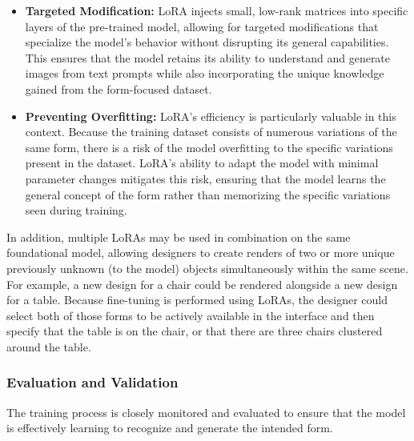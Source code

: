 \documentclass{article}
\begin{document}
\begin{itemize}
    \item \textbf{Targeted Modification:} LoRA injects small, low-rank matrices into specific layers of the pre-trained model, allowing for targeted modifications that specialize the model's behavior without disrupting its general capabilities. This ensures that the model retains its ability to understand and generate images from text prompts while also incorporating the unique knowledge gained from the form-focused dataset.
    \item \textbf{Preventing Overfitting:} LoRA's efficiency is particularly valuable in this context. Because the training dataset consists of numerous variations of the same form, there is a risk of the model overfitting to the specific variations present in the dataset. LoRA's ability to adapt the model with minimal parameter changes mitigates this risk, ensuring that the model learns the general concept of the form rather than memorizing the specific variations seen during training.
\end{itemize}

In addition, multiple LoRAs may be used in combination on the same foundational model, allowing designers to create renders of two or more unique previously unknown (to the model) objects simultaneously within the same scene. For example, a new design for a chair could be rendered alongside a new design for a table. Because fine-tuning is performed using LoRAs, the designer could select both of those forms to be actively available in the interface and then specify that the table is on the chair, or that there are three chairs clustered around the table. 

\subsubsection{Evaluation and Validation}
The training process is closely monitored and evaluated to ensure that the model is effectively learning to recognize and generate the intended form.
\end{document}
